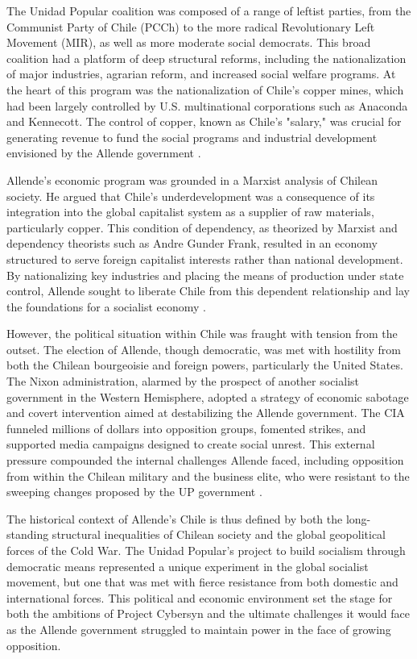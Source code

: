 \begin{refsection}
The Unidad Popular coalition was composed of a range of leftist parties, from the Communist Party of Chile (PCCh) to the more radical Revolutionary Left Movement (MIR), as well as more moderate social democrats. This broad coalition had a platform of deep structural reforms, including the nationalization of major industries, agrarian reform, and increased social welfare programs. At the heart of this program was the nationalization of Chile's copper mines, which had been largely controlled by U.S. multinational corporations such as Anaconda and Kennecott. The control of copper, known as Chile's "salary," was crucial for generating revenue to fund the social programs and industrial development envisioned by the Allende government \cite[pp.~101-104]{palmer2006}.

Allende's economic program was grounded in a Marxist analysis of Chilean society. He argued that Chile’s underdevelopment was a consequence of its integration into the global capitalist system as a supplier of raw materials, particularly copper. This condition of dependency, as theorized by Marxist and dependency theorists such as Andre Gunder Frank, resulted in an economy structured to serve foreign capitalist interests rather than national development. By nationalizing key industries and placing the means of production under state control, Allende sought to liberate Chile from this dependent relationship and lay the foundations for a socialist economy \cite[pp.~23-29]{gunderfrank1971}.

However, the political situation within Chile was fraught with tension from the outset. The election of Allende, though democratic, was met with hostility from both the Chilean bourgeoisie and foreign powers, particularly the United States. The Nixon administration, alarmed by the prospect of another socialist government in the Western Hemisphere, adopted a strategy of economic sabotage and covert intervention aimed at destabilizing the Allende government. The CIA funneled millions of dollars into opposition groups, fomented strikes, and supported media campaigns designed to create social unrest. This external pressure compounded the internal challenges Allende faced, including opposition from within the Chilean military and the business elite, who were resistant to the sweeping changes proposed by the UP government \cite[pp.~149-154]{kornbluh2016}.

The historical context of Allende's Chile is thus defined by both the long-standing structural inequalities of Chilean society and the global geopolitical forces of the Cold War. The Unidad Popular's project to build socialism through democratic means represented a unique experiment in the global socialist movement, but one that was met with fierce resistance from both domestic and international forces. This political and economic environment set the stage for both the ambitions of Project Cybersyn and the ultimate challenges it would face as the Allende government struggled to maintain power in the face of growing opposition.


\end{refsection}
